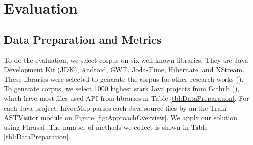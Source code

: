 \section{Evaluation}
\subsection{Data Preparation and Metrics}
To do the evaluation, we select corpus on six well-known libraries. They are Java Development Kit (JDK), Android, GWT, Joda-Time, Hibernate, and XStream. These libraries were selected to generate the corpus for other research works (\cite{8453132,Subramanian:2014:LAD:2568225.2568313}). To generate corpus, we select 1000 highest stars Java projects from Github (\cite{id:Github}), which have most files used API from libraries in Table \ref{tbl:DataPreparation}. For each Java project, InvocMap parses each Java source files by an the Train ASTVisitor module on Figure \ref{fig:ApproachOverview}. We apply our solution using Phrasal \cite{Green2014}.The number of methods we collect is shown in Table \ref{tbl:DataPreparation}. 


